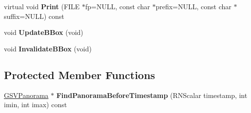 \begin{DoxyCompactItemize}
\item 
virtual void {\bfseries Print} (F\+I\+LE $\ast$fp=N\+U\+LL, const char $\ast$prefix=N\+U\+LL, const char $\ast$suffix=N\+U\+LL) const \hypertarget{class_g_s_v_segment_a1b6f36ee9370cfe5f1a55ea912f88a94}{}\label{class_g_s_v_segment_a1b6f36ee9370cfe5f1a55ea912f88a94}

\item 
void {\bfseries Update\+B\+Box} (void)\hypertarget{class_g_s_v_segment_a5f996984354d8a51db878c14f123f403}{}\label{class_g_s_v_segment_a5f996984354d8a51db878c14f123f403}

\item 
void {\bfseries Invalidate\+B\+Box} (void)\hypertarget{class_g_s_v_segment_a2c560689162aad74eab180c497d59d95}{}\label{class_g_s_v_segment_a2c560689162aad74eab180c497d59d95}

\end{DoxyCompactItemize}
\subsection*{Protected Member Functions}
\begin{DoxyCompactItemize}
\item 
\hyperlink{class_g_s_v_panorama}{G\+S\+V\+Panorama} $\ast$ {\bfseries Find\+Panorama\+Before\+Timestamp} (R\+N\+Scalar timestamp, int imin, int imax) const \hypertarget{class_g_s_v_segment_a7be5a1c60610270a7d565580b2931aee}{}\label{class_g_s_v_segment_a7be5a1c60610270a7d565580b2931aee}

\end{DoxyCompactItemize}
